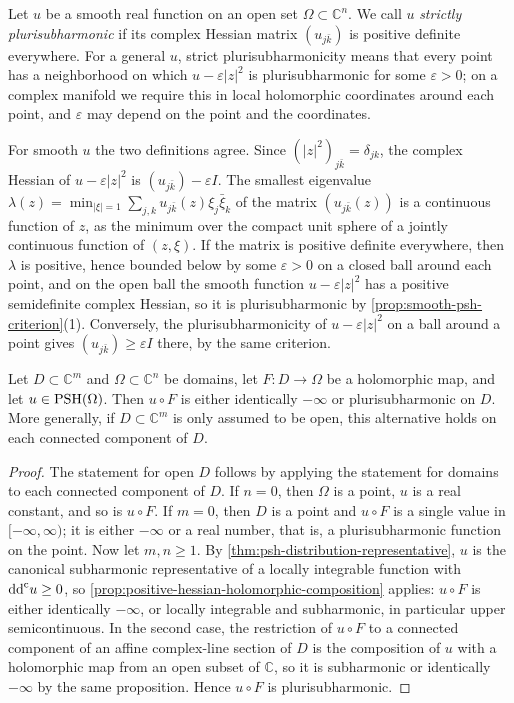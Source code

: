 Let $u$ be a smooth real function on an open set $\Omega\subset\mathbb C^n$. We call $u$ \emph{strictly plurisubharmonic} if its complex Hessian matrix $(u_{j\bar k})$ is positive definite everywhere. For a general $u$, strict plurisubharmonicity means that every point has a neighborhood on which $u-\varepsilon|z|^2$ is plurisubharmonic for some $\varepsilon>0$; on a complex manifold we require this in local holomorphic coordinates around each point, and $\varepsilon$ may depend on the point and the coordinates.

For smooth $u$ the two definitions agree. Since $(|z|^2)_{j\bar k}=\delta_{jk}$, the complex Hessian of $u-\varepsilon|z|^2$ is $(u_{j\bar k})-\varepsilon I$. The smallest eigenvalue $\lambda(z)=\min_{|\xi|=1}\sum_{j,k}u_{j\bar k}(z)\xi_j\bar\xi_k$ of the matrix $(u_{j\bar k}(z))$ is a continuous function of $z$, as the minimum over the compact unit sphere of a jointly continuous function of $(z,\xi)$. If the matrix is positive definite everywhere, then $\lambda$ is positive, hence bounded below by some $\varepsilon>0$ on a closed ball around each point, and on the open ball the smooth function $u-\varepsilon|z|^2$ has a positive semidefinite complex Hessian, so it is plurisubharmonic by \cref{prop:smooth-psh-criterion}(1). Conversely, the plurisubharmonicity of $u-\varepsilon|z|^2$ on a ball around a point gives $(u_{j\bar k})\geq\varepsilon I$ there, by the same criterion.

\begin{proposition}\label{prop:psh-holomorphic-pullback}
Let $D\subset\mathbb{C}^m$ and $\Omega\subset\mathbb{C}^n$ be domains, let $F\colon D\to\Omega$ be a holomorphic map, and let $u\in\mathrm{PSH}(\Omega)$. Then $u\circ F$ is either identically $-\infty$ or plurisubharmonic on $D$. More generally, if $D\subset\mathbb{C}^m$ is only assumed to be open, this alternative holds on each connected component of $D$.
\end{proposition}
\begin{proof}
The statement for open $D$ follows by applying the statement for domains to each connected component of $D$. If $n=0$, then $\Omega$ is a point, $u$ is a real constant, and so is $u\circ F$. If $m=0$, then $D$ is a point and $u\circ F$ is a single value in $[-\infty,\infty)$; it is either $-\infty$ or a real number, that is, a plurisubharmonic function on the point. Now let $m,n\geq1$. By \cref{thm:psh-distribution-representative}, $u$ is the canonical subharmonic representative of a locally integrable function with $\mathrm{dd}^{\mathrm{c}} u\geq0$, so \cref{prop:positive-hessian-holomorphic-composition} applies: $u\circ F$ is either identically $-\infty$, or locally integrable and subharmonic, in particular upper semicontinuous. In the second case, the restriction of $u\circ F$ to a connected component of an affine complex-line section of $D$ is the composition of $u$ with a holomorphic map from an open subset of $\mathbb{C}$, so it is subharmonic or identically $-\infty$ by the same proposition. Hence $u\circ F$ is plurisubharmonic.
\end{proof}

